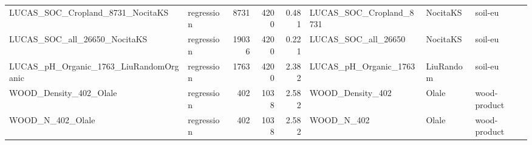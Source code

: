 \begin{landscape}
\begin{longtable}{L{6.2cm}L{2.1cm}rrrL{6.0cm}L{2.6cm}L{3.0cm}}
LUCAS\_\allowbreak{}SOC\_\allowbreak{}Cropland\_\allowbreak{}8731\_\allowbreak{}NocitaKS & regression & 8731 & 4200 & 0.481 & LUCAS\_\allowbreak{}SOC\_\allowbreak{}Cropland\_\allowbreak{}8731 & NocitaKS & soil-\allowbreak{}eu \\
LUCAS\_\allowbreak{}SOC\_\allowbreak{}all\_\allowbreak{}26650\_\allowbreak{}NocitaKS & regression & 19036 & 4200 & 0.221 & LUCAS\_\allowbreak{}SOC\_\allowbreak{}all\_\allowbreak{}26650 & NocitaKS & soil-\allowbreak{}eu \\
LUCAS\_\allowbreak{}pH\_\allowbreak{}Organic\_\allowbreak{}1763\_\allowbreak{}LiuRandomOrganic & regression & 1763 & 4200 & 2.382 & LUCAS\_\allowbreak{}pH\_\allowbreak{}Organic\_\allowbreak{}1763 & LiuRandom & soil-\allowbreak{}eu \\
WOOD\_\allowbreak{}Density\_\allowbreak{}402\_\allowbreak{}Olale & regression & 402 & 1038 & 2.582 & WOOD\_\allowbreak{}Density\_\allowbreak{}402 & Olale & wood-\allowbreak{}product \\
WOOD\_\allowbreak{}N\_\allowbreak{}402\_\allowbreak{}Olale & regression & 402 & 1038 & 2.582 & WOOD\_\allowbreak{}N\_\allowbreak{}402 & Olale & wood-\allowbreak{}product \\
\end{longtable}
\endgroup
\end{landscape}
\clearpage
